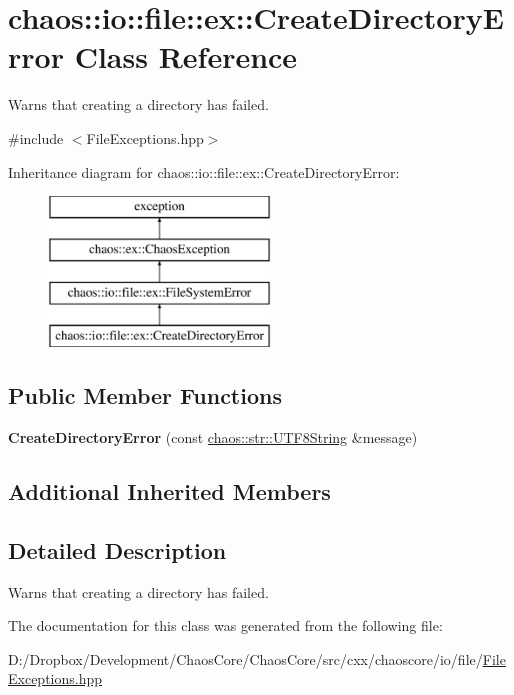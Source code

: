 \hypertarget{classchaos_1_1io_1_1file_1_1ex_1_1_create_directory_error}{}\section{chaos\+:\+:io\+:\+:file\+:\+:ex\+:\+:Create\+Directory\+Error Class Reference}
\label{classchaos_1_1io_1_1file_1_1ex_1_1_create_directory_error}


Warns that creating a directory has failed.  




{\ttfamily \#include $<$File\+Exceptions.\+hpp$>$}

Inheritance diagram for chaos\+:\+:io\+:\+:file\+:\+:ex\+:\+:Create\+Directory\+Error\+:\begin{figure}[H]
\begin{center}
\leavevmode
\includegraphics[height=4.000000cm]{classchaos_1_1io_1_1file_1_1ex_1_1_create_directory_error}
\end{center}
\end{figure}
\subsection*{Public Member Functions}
\begin{DoxyCompactItemize}
\item 
\hypertarget{classchaos_1_1io_1_1file_1_1ex_1_1_create_directory_error_a216b504fcc4a3552315ae2c207532576}{}{\bfseries Create\+Directory\+Error} (const \hyperlink{classchaos_1_1str_1_1_u_t_f8_string}{chaos\+::str\+::\+U\+T\+F8\+String} \&message)\label{classchaos_1_1io_1_1file_1_1ex_1_1_create_directory_error_a216b504fcc4a3552315ae2c207532576}

\end{DoxyCompactItemize}
\subsection*{Additional Inherited Members}


\subsection{Detailed Description}
Warns that creating a directory has failed. 

The documentation for this class was generated from the following file\+:\begin{DoxyCompactItemize}
\item 
D\+:/\+Dropbox/\+Development/\+Chaos\+Core/\+Chaos\+Core/src/cxx/chaoscore/io/file/\hyperlink{_file_exceptions_8hpp}{File\+Exceptions.\+hpp}\end{DoxyCompactItemize}
